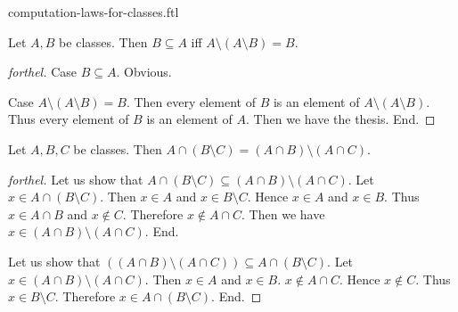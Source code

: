 \documentclass{naproche-library}
\begin{document}
\begin{smodule}{computation-laws-for-classes.ftl}
  \begin{proposition}[forthel,id=FOUNDATIONS_02_4938646769631232]
    Let $A, B$ be classes.
    Then $B \subseteq A$ iff $A \setminus (A \setminus B) = B$.
  \end{proposition}
  \begin{proof}[forthel]
    Case $B \subseteq A$. Obvious.

    Case $A \setminus (A \setminus B) = B$.
      Then every element of $B$ is an element of $A \setminus (A \setminus B)$.
      Thus every element of $B$ is an element of $A$.
      Then we have the thesis.
    End.
  \end{proof}

  \begin{proposition}[forthel,id=FOUNDATIONS_02_5811954316738560]
    Let $A, B, C$ be classes.
    Then $A \cap (B \setminus C) = (A \cap B) \setminus (A \cap C)$.
  \end{proposition}
  \begin{proof}[forthel]
    Let us show that $A \cap (B \setminus C) \subseteq (A \cap B) \setminus (A \cap C)$.
      Let $x \in A \cap (B \setminus C)$.
      Then $x \in A$ and $x \in B \setminus C$.
      Hence $x \in A$ and $x \in B$.
      Thus $x \in A \cap B$ and $x \notin C$.
      Therefore $x \notin A \cap C$.
      Then we have $x \in (A \cap B) \setminus (A \cap C)$.
    End.

    Let us show that $((A \cap B) \setminus (A \cap C)) \subseteq A \cap (B \setminus C)$. %
      Let $x \in (A \cap B) \setminus (A \cap C)$.
      Then $x \in A$ and $x \in B$.
      $x \notin A \cap C$.
      Hence $x \notin C$.
      Thus $x \in B \setminus C$.
      Therefore $x \in A \cap (B \setminus C)$.
    End.
  \end{proof}
\end{smodule}
\end{document}
